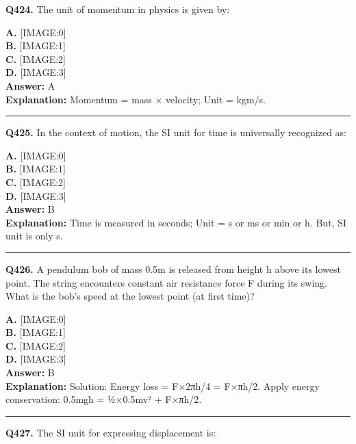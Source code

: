 \documentclass[12pt]{article}
\begin{document}
\noindent
\textbf{Q424.} The unit of momentum in physics is given by:



\textbf{A.} [IMAGE:0] \\
\textbf{B.} [IMAGE:1] \\
\textbf{C.} [IMAGE:2] \\
\textbf{D.} [IMAGE:3] \\

\textbf{Answer:} A \\
\textbf{Explanation:} Momentum = mass × velocity; Unit = kgm/s.

\hrule
\vspace{1em}


\noindent
\textbf{Q425.} In the context of motion, the SI unit for time is universally recognized as:



\textbf{A.} [IMAGE:0] \\
\textbf{B.} [IMAGE:1] \\
\textbf{C.} [IMAGE:2] \\
\textbf{D.} [IMAGE:3] \\

\textbf{Answer:} B \\
\textbf{Explanation:} Time is measured in seconds; Unit = s or ms or min or h.
But, SI unit is only s.

\hrule
\vspace{1em}


\noindent
\textbf{Q426.} A pendulum bob of mass 0.5m is released from height h above its lowest point. The string encounters constant air resistance force F during its swing. What is the bob's speed at the lowest point (at first time)?



\textbf{A.} [IMAGE:0] \\
\textbf{B.} [IMAGE:1] \\
\textbf{C.} [IMAGE:2] \\
\textbf{D.} [IMAGE:3] \\

\textbf{Answer:} B \\
\textbf{Explanation:} Solution: Energy loss = F×2πh/4 = F×πh/2. Apply energy conservation: 0.5mgh = ½×0.5mv² + F×πh/2.

\hrule
\vspace{1em}


\noindent
\textbf{Q427.} The SI unit for expressing displacement is:
\end{document}
